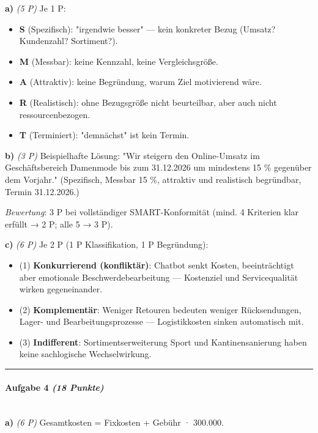 \documentclass[11pt, a4paper]{article}
\begin{document}
\textbf{a)} \textit{(5 P)} Je 1 P:

\begin{itemize}
  \item \textbf{S} (Spezifisch): "irgendwie besser" — kein konkreter Bezug (Umsatz? Kundenzahl? Sortiment?).
  \item \textbf{M} (Messbar): keine Kennzahl, keine Vergleichsgröße.
  \item \textbf{A} (Attraktiv): keine Begründung, warum Ziel motivierend wäre.
  \item \textbf{R} (Realistisch): ohne Bezugsgröße nicht beurteilbar, aber auch nicht ressourcenbezogen.
  \item \textbf{T} (Terminiert): "demnächst" ist kein Termin.
\end{itemize}

\textbf{b)} \textit{(3 P)} Beispielhafte Lösung: "Wir steigern den Online-Umsatz im Geschäftsbereich Damenmode bis zum 31.12.2026 um mindestens 15 \% gegenüber dem Vorjahr." (Spezifisch, Messbar 15 \%, attraktiv und realistisch begründbar, Termin 31.12.2026.)

\textit{Bewertung}: 3 P bei vollständiger SMART-Konformität (mind. 4 Kriterien klar erfüllt → 2 P; alle 5 → 3 P).


\textbf{c)} \textit{(6 P)} Je 2 P (1 P Klassifikation, 1 P Begründung):

\begin{itemize}
  \item (1) \textbf{Konkurrierend (konfliktär)}: Chatbot senkt Kosten, beeinträchtigt aber emotionale Beschwerdebearbeitung — Kostenziel und Servicequalität wirken gegeneinander.
  \item (2) \textbf{Komplementär}: Weniger Retouren bedeuten weniger Rücksendungen, Lager- und Bearbeitungsprozesse — Logistikkosten sinken automatisch mit.
  \item (3) \textbf{Indifferent}: Sortimentserweiterung Sport und Kantinensanierung haben keine sachlogische Wechselwirkung.
\end{itemize}


\noindent\textcolor{rulegray}{\rule{\linewidth}{0.4pt}}


\paragraph{Aufgabe 4 \textit{(18 Punkte)}}\mbox{}\\[2pt]

\textbf{a)} \textit{(6 P)} Gesamtkosten = Fixkosten + Gebühr · 300.000.
\end{document}
